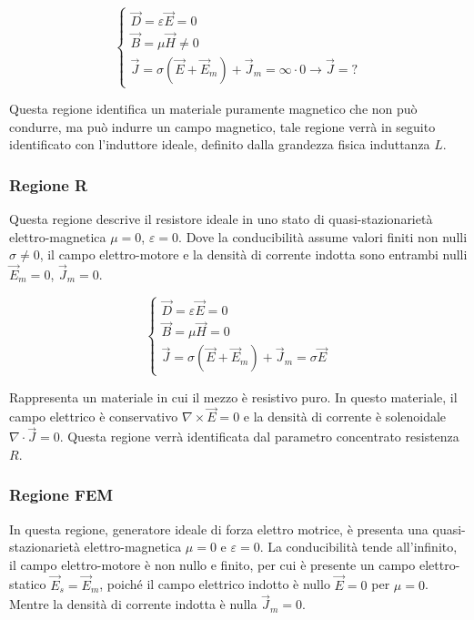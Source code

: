 \documentclass{article}
\numberwithin{equation}{subsection}
\begin{document}
\begin{equation*}
    \begin{cases}
        \vec{D}=\varepsilon\vec{E}=0\\
        \vec{B}=\mu\vec{H}\neq0\\
        \vec{J}=\sigma(\vec{E}+\vec{E}_m)+\vec{J}_m=\infty\cdot0\to\vec{J}=?
    \end{cases}
\end{equation*}

Questa regione identifica un materiale puramente magnetico che non può condurre, ma può indurre un campo magnetico, tale regione verrà in seguito identificato con l'induttore ideale, 
definito dalla grandezza fisica induttanza $L$. 

\subsubsection{Regione R}

Questa regione descrive il resistore ideale in uno stato di quasi-stazionarietà elettro-magnetica $\mu=0$, $\varepsilon=0$. Dove la conducibilità assume valori 
finiti non nulli $\sigma\neq0$, il campo elettro-motore e la densità di corrente indotta sono entrambi nulli $\vec{E}_m=0$, $\vec{J}_m=0$.

\begin{equation*}
    \begin{cases}
        \vec{D}=\varepsilon\vec{E}=0\\
        \vec{B}=\mu\vec{H}=0\\
        \vec{J}=\sigma(\vec{E}+\vec{E}_m)+\vec{J}_m=\sigma\vec{E}
    \end{cases}
\end{equation*}

Rappresenta un materiale in cui il mezzo è resistivo puro. In questo materiale, il campo elettrico è conservativo $\nabla\times\vec{E}=0$ e la densità di corrente è solenoidale 
$\nabla\cdot\vec{J}=0$. Questa regione verrà identificata dal parametro concentrato resistenza $R$. 

\subsubsection{Regione FEM}

In questa regione, generatore ideale di forza elettro motrice, è presenta una quasi-stazionarietà elettro-magnetica $\mu=0$ e $\varepsilon=0$. La conducibilità tende all'infinito, 
il campo elettro-motore è non nullo e finito, per cui è presente un campo elettro-statico $\vec{E}_s=\vec{E}_m$, poiché il campo elettrico indotto è nullo $\vec{E}=0$ per 
$\mu=0$. Mentre la densità di corrente indotta è nulla $\vec{J}_m=0$. 
\end{document}
